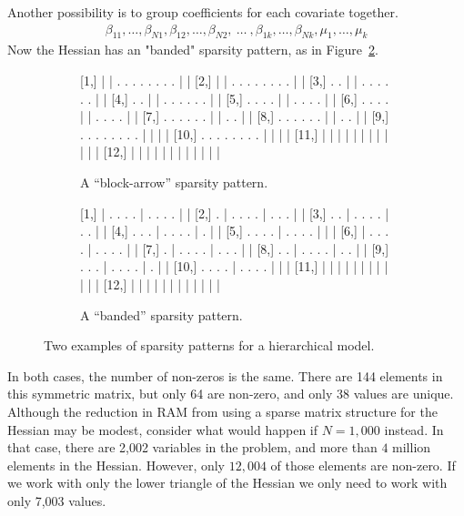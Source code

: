 \documentclass[article]{jss}\usepackage[]{graphicx}\usepackage[]{color}
\begin{document}
Another possibility is to group coefficients for each covariate
together.
\begin{align}
\beta_{11},\dotsc,\beta_{N1},\beta_{12},\dotsc,\beta_{N2},~\dotsc~,\beta_{1k},\dotsc,\beta_{Nk},\mu_1,\dotsc,\mu_k
\end{align}
Now the Hessian has an "banded" sparsity pattern, as in Figure~\ref{fig:banded}.
\begin{figure}[tbp]
  \begin{subfigure}[b]{.5\textwidth}
\begin{Schunk}
\begin{Soutput}
                             
 [1,] | | . . . . . . . . | |
 [2,] | | . . . . . . . . | |
 [3,] . . | | . . . . . . | |
 [4,] . . | | . . . . . . | |
 [5,] . . . . | | . . . . | |
 [6,] . . . . | | . . . . | |
 [7,] . . . . . . | | . . | |
 [8,] . . . . . . | | . . | |
 [9,] . . . . . . . . | | | |
[10,] . . . . . . . . | | | |
[11,] | | | | | | | | | | | |
[12,] | | | | | | | | | | | |
\end{Soutput}
\end{Schunk}
\caption{A ``block-arrow'' sparsity pattern.}\label{fig:blockarrow}
\end{subfigure}
\begin{subfigure}[b]{.5\textwidth}
\begin{Schunk}
\begin{Soutput}
                             
 [1,] | . . . . | . . . . | |
 [2,] . | . . . . | . . . | |
 [3,] . . | . . . . | . . | |
 [4,] . . . | . . . . | . | |
 [5,] . . . . | . . . . | | |
 [6,] | . . . . | . . . . | |
 [7,] . | . . . . | . . . | |
 [8,] . . | . . . . | . . | |
 [9,] . . . | . . . . | . | |
[10,] . . . . | . . . . | | |
[11,] | | | | | | | | | | | |
[12,] | | | | | | | | | | | |
\end{Soutput}
\end{Schunk}
\caption{A ``banded'' sparsity pattern.}\label{fig:banded}
\end{subfigure}
\caption{Two examples of sparsity patterns for a hierarchical model.}\label{fig:patterns}
\end{figure}

In both cases, the number of non-zeros is the same.   There are
144 elements in this symmetric matrix, but only 64 are
non-zero, and only 38 values are unique.  Although the reduction in
RAM from using a sparse matrix structure for the Hessian may be
modest, consider what would happen if $N=1,000$ instead.  In that case,
there are 2,002 variables in the problem, and more than $4$ million
elements in the Hessian.  However, only $12,004$ of those elements are
non-zero.  If we work with only the lower triangle of the Hessian we only need to work with
only 7,003 values.
\end{document}
